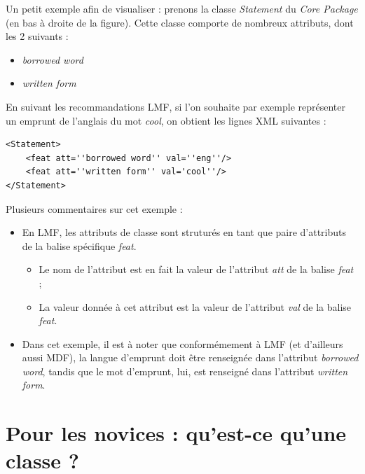 \documentclass[a4paper,12pt]{article}
\begin{document}
Un petit exemple afin de visualiser : prenons la classe \textit{Statement} du \textit{Core Package} (en bas \`a droite de la figure). Cette classe comporte de nombreux attributs, dont les 2 suivants :
\begin{itemize}
\item \textit{borrowed word}
\item \textit{written form}
\end{itemize}
En suivant les recommandations LMF, si l'on souhaite par exemple repr\'esenter un emprunt de l'anglais du mot \textit{cool}, on obtient les lignes XML suivantes :
\begin{lstlisting}
<Statement>
	<feat att=''borrowed word'' val=''eng''/>
	<feat att=''written form'' val='cool''/>
</Statement>
\end{lstlisting}
Plusieurs commentaires sur cet exemple :
\begin{itemize}
\item En LMF, les attributs de classe sont strutur\'es en tant que paire d'attributs de la balise sp\'ecifique \textit{feat}.
\begin{itemize}
\item Le nom de l'attribut est en fait la valeur de l'attribut \textit{att} de la balise \textit{feat} ;
\item La valeur donn\'ee \`a cet attribut est la valeur de l'attribut \textit{val} de la balise \textit{feat}.
\end{itemize}
\item Dans cet exemple, il est \`a noter que conform\'emement \`a LMF (et d'ailleurs aussi MDF), la langue d'emprunt doit \^etre renseign\'ee dans l'attribut \textit{borrowed word}, tandis que le mot d'emprunt, lui, est renseign\'e dans l'attribut \textit{written form}.
\end{itemize}

\section{Pour les novices : qu'est-ce qu'une classe ?}
\end{document}
